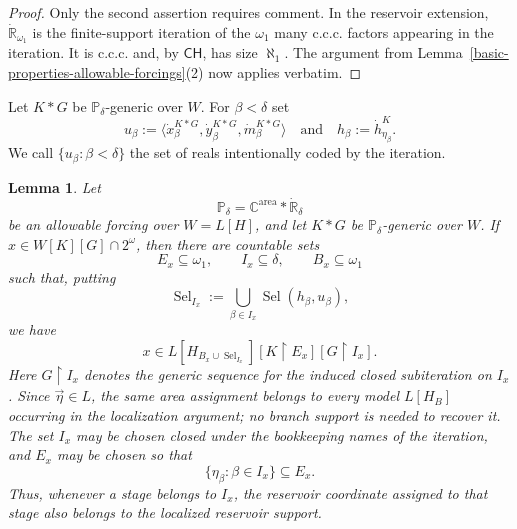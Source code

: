 \documentclass[a4paper,11pt]{article}
\newtheorem{lemma}[theorem]{Lemma}
\newcommand{\forceP}{\mathbb{P}}
\newcommand{\forceR}{\mathbb{R}}
\newcommand{\forceC}{\mathbb{C}}
\newcommand{\CH}{\mathsf{CH}}
\begin{document}
\begin{proof}
Only the second assertion requires comment.  In the reservoir extension,
$\dot{\forceR}_{\omega_1}$ is the finite-support iteration of the
$\omega_1$ many c.c.c. factors appearing in the iteration.  It is
c.c.c. and, by $\CH$, has size $\aleph_1$.  The argument from
Lemma~\ref{basic-properties-allowable-forcings}(2) now applies verbatim.
\end{proof}

Let $K*G$ be $\forceP_\delta$-generic over $W$.  For $\beta<\delta$ set
\[
   u_\beta
   :=\bigl\langle
      \dot x_\beta^{K*G},
      \dot y_\beta^{K*G},
      \dot m_\beta^{K*G}
   \bigr\rangle
   \quad\text{and}\quad
   h_\beta:=\dot h_{\eta_\beta}^{K}.
\]
We call $\{u_\beta:\beta<\delta\}$ the set of reals intentionally coded by
the iteration.

\begin{lemma}
\label{allowable-localization-lemma}
Let
\[
   \forceP_\delta=\forceC^{\mathrm{area}}*\dot{\forceR}_\delta
\]
be an allowable forcing over $W=L[H]$, and let $K*G$ be
$\forceP_\delta$-generic over $W$.  If $x\in W[K][G]\cap2^\omega$,
then there are countable sets
\[
   E_x\subseteq\omega_1,\qquad I_x\subseteq\delta,
   \qquad B_x\subseteq\omega_1
\]
such that, putting
\[
   \operatorname{Sel}_{I_x}
   :=\bigcup_{\beta\in I_x}\operatorname{Sel}(h_\beta,u_\beta),
\]
we have
\[
   x\in
   L[H_{B_x\cup\operatorname{Sel}_{I_x}}]
    [K\upharpoonright E_x]
    [G\upharpoonright I_x].
\]
Here $G\upharpoonright I_x$ denotes the generic sequence for the induced
closed subiteration on $I_x$.  Since $\vec\eta\in L$, the same area assignment
belongs to every model $L[H_B]$ occurring in the localization argument; no
branch support is needed to recover it.  The set $I_x$ may be chosen closed
under the bookkeeping names of the iteration, and $E_x$ may be chosen so that
\[
   \{\eta_\beta:\beta\in I_x\}\subseteq E_x.
\]
Thus, whenever a stage belongs to $I_x$, the reservoir coordinate assigned to
that stage also belongs to the localized reservoir support.
\end{lemma}
\end{document}
